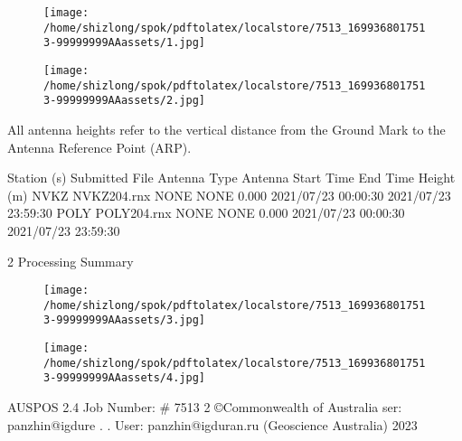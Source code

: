 \documentclass[a4paper,12pt]{article}
\begin{document}
\begin{figure}[h]

\texttt{[image: /home/shizlong/spok/pdftolatex/localstore/7513\_1699368017513-99999999AAassets/1.jpg]}

\centering

\end{figure}

\begin{figure}[h]

\texttt{[image: /home/shizlong/spok/pdftolatex/localstore/7513\_1699368017513-99999999AAassets/2.jpg]}

\centering

\end{figure}

    All antenna heights refer to the vertical distance from the Ground Mark to the Antenna  Reference Point (ARP). 

\vspace{10pt}

                   Station (s) Submitted File Antenna Type Antenna Start Time End Time   Height (m)  NVKZ NVKZ204.rnx NONE NONE 0.000 2021/07/23 00:00:30 2021/07/23 23:59:30  POLY POLY204.rnx NONE NONE 0.000 2021/07/23 00:00:30 2021/07/23 23:59:30                                   

\vspace{10pt}

    2 Processing Summary 

\vspace{10pt}

\begin{figure}[h]

\texttt{[image: /home/shizlong/spok/pdftolatex/localstore/7513\_1699368017513-99999999AAassets/3.jpg]}

\centering

\end{figure}

\begin{figure}[h]

\texttt{[image: /home/shizlong/spok/pdftolatex/localstore/7513\_1699368017513-99999999AAassets/4.jpg]}

\centering

\end{figure}

         AUSPOS 2.4 Job Number: \# 7513 2 ©Commonwealth of Australia    ser: panzhin@igdure . .  User: panzhin@igduran.ru (Geoscience Australia) 2023 
\end{document}
